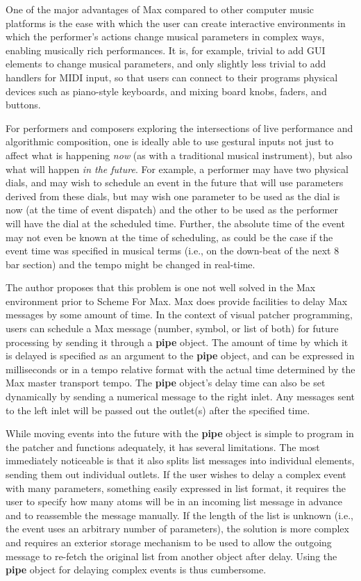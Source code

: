 \documentclass[acmsmall]{acmart}
\begin{document}
One of the major advantages of Max compared to other computer music platforms 
is the ease with which the user can create interactive environments in which the performer's actions 
change musical parameters in complex ways, enabling 
musically rich performances. It is, for example, trivial to add GUI elements to change
musical parameters, and only slightly less trivial to add handlers for MIDI input, 
so that users can connect to their programs physical devices such as
piano-style keyboards, and mixing board knobs, faders, and buttons. 

For performers and composers exploring the intersections of live performance and algorithmic
composition, one is ideally able to use gestural inputs not just to affect
what is happening \textit{now} (as with a traditional musical instrument), but also what will 
happen \textit{in the future}. For example, a performer may have two physical dials,
and may wish to schedule an event in the future that will use parameters derived
from these dials, but may wish one parameter to be used as the dial is now
(at the time of event dispatch) 
and the other to be used as the performer will have the dial at the scheduled time.
Further, the absolute time of the event may not even be known at the time of 
scheduling, as could be the case if the event time was specified in musical terms 
(i.e., on the down-beat of the next 8 bar section) and the tempo might be changed in real-time. 

The author proposes that this problem is one not well solved in the Max environment prior 
to Scheme For Max. Max does provide facilities to delay Max messages by some
amount of time. In the context of visual patcher programming, users can schedule 
a Max message (number, symbol, or list of both) for future processing by sending it through a 
\textbf{pipe} object. The amount of time by which it is delayed is specified as an argument to 
the \textbf{pipe} object, and can be expressed in milliseconds or in a tempo 
relative format with the actual time determined by the Max master transport tempo. 
The \textbf{pipe} object’s delay time can also be set dynamically by sending a numerical message
to the right inlet. Any messages sent to the left inlet will be passed out
the outlet(s) after the specified time. 

While moving events into the future with the \textbf{pipe} object is simple to program 
in the patcher and functions adequately, 
it has several limitations. The most immediately noticeable is that it also splits 
list messages into individual elements, sending them out individual outlets. 
If the user wishes to delay a complex event with many parameters, something easily 
expressed in list format, it requires the user to specify how many atoms will 
be in an incoming list message in advance and to reassemble the message manually.
If the length of the list is unknown (i.e., the event uses an arbitrary number
of parameters), the solution is more complex and requires 
an exterior storage mechanism to be used to allow the outgoing 
message to re-fetch the original list from another object after delay. Using
the \textbf{pipe} object for delaying complex events is thus cumbersome. 
\end{document}
